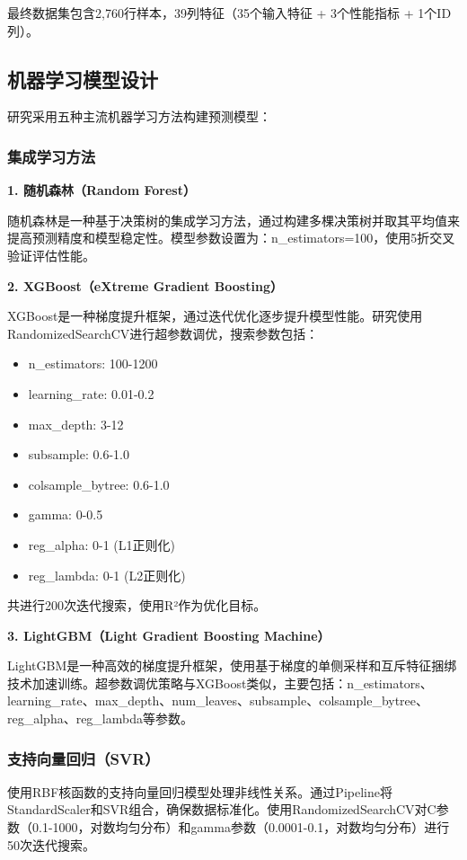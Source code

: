 \documentclass[12pt,a4paper]{article}
\begin{document}
最终数据集包含2,760行样本，39列特征（35个输入特征 + 3个性能指标 + 1个ID列）。

\subsection{机器学习模型设计}

研究采用五种主流机器学习方法构建预测模型：

\subsubsection{集成学习方法}

\textbf{1. 随机森林（Random Forest）}

随机森林是一种基于决策树的集成学习方法，通过构建多棵决策树并取其平均值来提高预测精度和模型稳定性。模型参数设置为：n\_estimators=100，使用5折交叉验证评估性能。

\textbf{2. XGBoost（eXtreme Gradient Boosting）}

XGBoost是一种梯度提升框架，通过迭代优化逐步提升模型性能。研究使用RandomizedSearchCV进行超参数调优，搜索参数包括：
\begin{itemize}
\item n\_estimators: 100-1200
\item learning\_rate: 0.01-0.2
\item max\_depth: 3-12
\item subsample: 0.6-1.0
\item colsample\_bytree: 0.6-1.0
\item gamma: 0-0.5
\item reg\_alpha: 0-1 (L1正则化)
\item reg\_lambda: 0-1 (L2正则化)
\end{itemize}

共进行200次迭代搜索，使用R²作为优化目标。

\textbf{3. LightGBM（Light Gradient Boosting Machine）}

LightGBM是一种高效的梯度提升框架，使用基于梯度的单侧采样和互斥特征捆绑技术加速训练。超参数调优策略与XGBoost类似，主要包括：n\_estimators、learning\_rate、max\_depth、num\_leaves、subsample、colsample\_bytree、reg\_alpha、reg\_lambda等参数。

\subsubsection{支持向量回归（SVR）}

使用RBF核函数的支持向量回归模型处理非线性关系。通过Pipeline将StandardScaler和SVR组合，确保数据标准化。使用RandomizedSearchCV对C参数（0.1-1000，对数均匀分布）和gamma参数（0.0001-0.1，对数均匀分布）进行50次迭代搜索。
\end{document}

